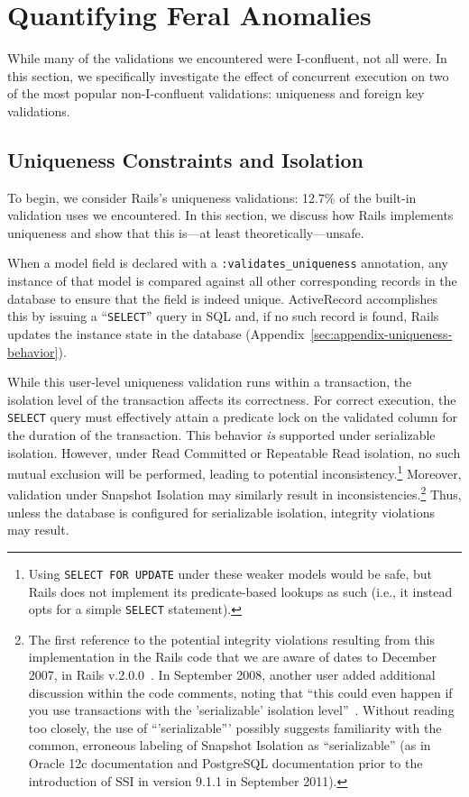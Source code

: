 
\section{Quantifying Feral Anomalies}
\label{sec:evaluation}

While many of the validations we encountered were I-confluent,
not all were. In this section, we specifically investigate the effect
of concurrent execution on two of the most popular non-I-confluent
validations: uniqueness and foreign key validations.

\subsection{Uniqueness Constraints and Isolation}

To begin, we consider Rails's uniqueness validations: 12.7\% of the
built-in validation uses we encountered. In this section, we discuss
how Rails implements uniqueness and show that this is---at least
theoretically---unsafe.

When a model field is declared with a \texttt{:validates\_uniqueness}
annotation, any instance of that model is compared against all other
corresponding records in the database to ensure that the field is
indeed unique. ActiveRecord accomplishes this by issuing a
``\texttt{SELECT}'' query in SQL and, if no such record is found,
Rails updates the instance state in the database
(Appendix~\ref{sec:appendix-uniqueness-behavior}).

While this user-level uniqueness validation runs within a transaction,
the isolation level of the transaction affects its
correctness. For correct execution, the \texttt{SELECT} query must
effectively attain a predicate lock on the validated column for the
duration of the transaction. This behavior \textit{is} supported under
serializable isolation. However, under Read Committed or Repeatable
Read isolation, no such mutual exclusion will be performed, leading to
potential inconsistency.\footnote{Using \texttt{SELECT FOR UPDATE}
  under these weaker models would be safe, but Rails does not
  implement its predicate-based lookups as such (i.e., it instead opts
  for a simple \texttt{SELECT} statement).}  Moreover, validation under Snapshot Isolation
may similarly result in
inconsistencies.\footnote{The first reference to the potential integrity
  violations resulting from this implementation in the Rails code that
  we are aware of dates to December 2007, in Rails
  v.2.0.0~\cite{code-unique-race-one}.  In September 2008, another
  user added additional discussion within the code comments, noting
  that ``this could even happen if you use transactions with the
  'serializable' isolation
  level''~\cite{code-unique-race-two}. Without reading too closely,
  the use of ``'serializable''' possibly suggests familiarity with the
  common, erroneous labeling of Snapshot Isolation as ``serializable''
  (as in Oracle 12c documentation and PostgreSQL documentation prior
  to the introduction of SSI in version 9.1.1 in September
  2011)\label{fn:si-rails}. } Thus, unless the database is configured
for serializable isolation, integrity violations may result.

